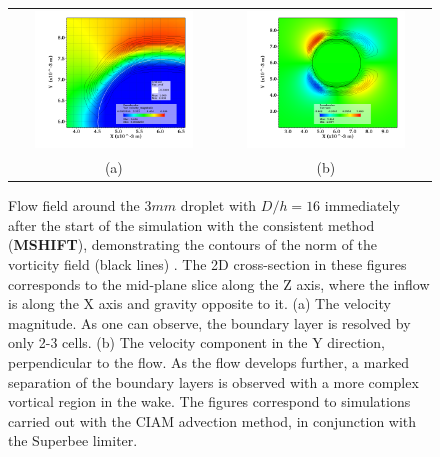 \begin{figure}
\begin{center}
\begin{tabular}{cc}
\hspace*{-1.0cm}
\includegraphics[width=0.8\textwidth]{plots/raindrop/mc_vorticity_zoom.png} & 
\hspace{-0.4cm}%
\includegraphics[width=0.8\textwidth]{plots/raindrop/mc_vorticity.png} \\ 
\hspace{-0.8cm}%
(a) & (b)
\end{tabular}
\end{center}
\caption{Flow field around the $3 mm$ droplet with $D/h = 16$ immediately 
after the start of the simulation with the consistent method (\textbf{MSHIFT}), 
demonstrating the contours of the norm of the vorticity field (black lines) . 
The 2D cross-section in these figures corresponds to the 
mid-plane slice along the Z axis, where the inflow is along 
the X axis and gravity opposite to it. (a) The velocity magnitude. 
As one can observe, the boundary layer is resolved by only 2-3 cells. 
(b) The velocity component in the Y direction, perpendicular to the flow. 
As the flow develops further, a marked separation of the boundary layers is observed with 
a more complex vortical region in the wake.
The figures correspond to simulations carried out with the 
CIAM advection method, in conjunction with the Superbee limiter.}
\label{flow_field}
\end{figure}


